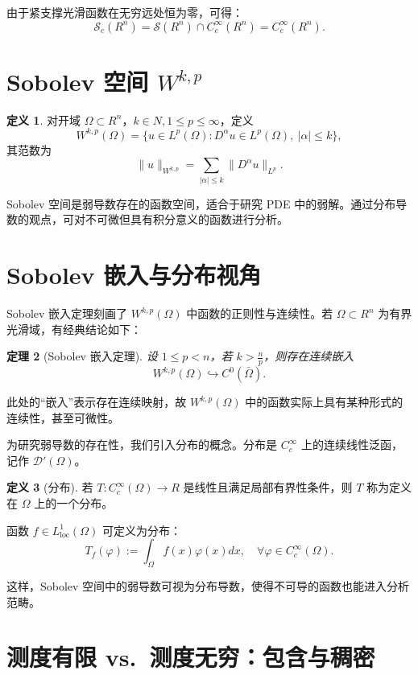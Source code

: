 \documentclass[12pt,a4paper]{article}
\newcommand{\diff}{\mathop{}\!\mathrm{d}}  %
\newcommand{\R}{\mathbb{R}}                %
\newcommand{\N}{\mathbb{N}}                %
\def\R{R}%
\def\N{N}%
\def\diff{d}%
\theoremstyle{plain}
\newtheorem{theorem}{定理}[section]
\theoremstyle{definition}
\newtheorem{definition}[theorem]{定义}
\theoremstyle{remark}
\begin{document}
由于紧支撑光滑函数在无穷远处恒为零，可得：
\[
\mathcal S_c(\R^n)
=\mathcal S(\R^n)\cap C_c^\infty(\R^n)
=C_c^\infty(\R^n).
\]



\section{Sobolev 空间 $W^{k,p}$}

\begin{definition}
对开域 $\Omega\subset\R^n$，$k\in\N,1\le p\le\infty$，定义
\[
W^{k,p}(\Omega)
=\{u\in L^p(\Omega):D^\alpha u\in L^p(\Omega),\ |\alpha|\le k\},
\]
其范数为
\[
\|u\|_{W^{k,p}}
=\sum_{|\alpha|\le k}\|D^\alpha u\|_{L^p}.
\]
\end{definition}

Sobolev 空间是弱导数存在的函数空间，适合于研究 PDE 中的弱解。通过分布导数的观点，可对不可微但具有积分意义的函数进行分析。

\section{Sobolev 嵌入与分布视角}

Sobolev 嵌入定理刻画了 $W^{k,p}(\Omega)$ 中函数的正则性与连续性。若 $\Omega\subset\R^n$ 为有界光滑域，有经典结论如下：

\begin{theorem}[Sobolev 嵌入定理]
设 $1\le p<n$，若 $k>\frac{n}{p}$，则存在连续嵌入
\[
W^{k,p}(\Omega)\hookrightarrow C^0(\bar\Omega).
\]
\end{theorem}

此处的“嵌入”表示存在连续映射，故 $W^{k,p}(\Omega)$ 中的函数实际上具有某种形式的连续性，甚至可微性。

为研究弱导数的存在性，我们引入分布的概念。分布是 $C_c^\infty$ 上的连续线性泛函，记作 $\mathcal D'(\Omega)$。

\begin{definition}[分布]
若 $T:C_c^\infty(\Omega)\to\R$ 是线性且满足局部有界性条件，则 $T$ 称为定义在 $\Omega$ 上的一个分布。
\end{definition}

函数 $f\in L^1_{\text{loc}}(\Omega)$ 可定义为分布：
\[
T_f(\varphi):=\int_\Omega f(x)\varphi(x)\diff x,\quad\forall\varphi\in C_c^\infty(\Omega).
\]

这样，Sobolev 空间中的弱导数可视为分布导数，使得不可导的函数也能进入分析范畴。

\section{测度有限 vs.\ 测度无穷：包含与稠密}
\end{document}
